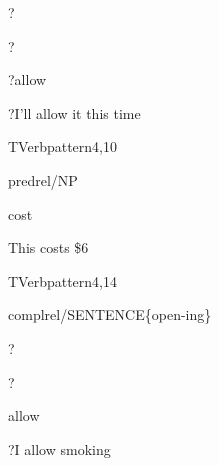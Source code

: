 
\begin{thetadescr}
\evitem ?
\esitem
     \begin{examples}
        \example ?
     \end{examples}
\end{thetadescr}



\begin{thetadescr}
\evitem ?allow
\esitem
     \begin{examples}
        \example ?I'll allow it this time
     \end{examples}
\end{thetadescr}


\newpage
{}
\begin{vpattern}
 TVerbpattern4,10  
\csritem \mbox{}\\
     \begin{csr}
      predrel/NP
     \end{csr}
\remarksitem
\end{vpattern}


\begin{thetadescr}
\evitem cost
\esitem
     \begin{examples}
        \example  This costs \$6
     \end{examples}
\end{thetadescr}


\newpage
{}
\begin{vpattern}
 TVerbpattern4,14
\csritem \mbox{}\\
     \begin{csr}
       complrel/SENTENCE\{open-ing\}
     \end{csr}
\remarksitem
\end{vpattern}


\begin{thetadescr}
\evitem ?
\esitem
     \begin{examples}
        \example ?
     \end{examples}
\end{thetadescr}



\begin{thetadescr}
\evitem allow
\esitem
     \begin{examples}
        \example  ?I allow smoking
     \end{examples}
\end{thetadescr}


